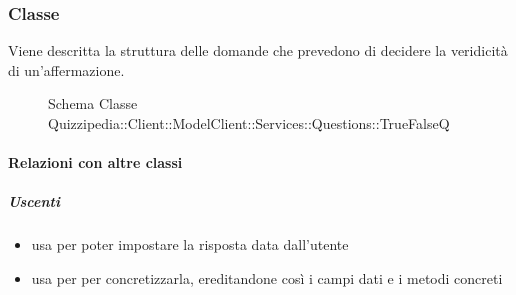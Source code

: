 \subsubsection{Classe }
Viene descritta la struttura delle domande che prevedono di decidere la veridicità di un'affermazione.
\begin{figure}[H]
\centering
\noindent{}
\caption[Schema Classe TrueFalseQ]{Schema Classe Quizzipedia::Client::ModelClient::Services::Questions::TrueFalseQ}
\end{figure}
\paragraph{Relazioni con altre classi}
\subparagraph{Uscenti}
\begin{itemize}
\item usa  per poter impostare la risposta data dall'utente
\item usa  per per concretizzarla, ereditandone così i campi dati e i metodi concreti
\end{itemize}
